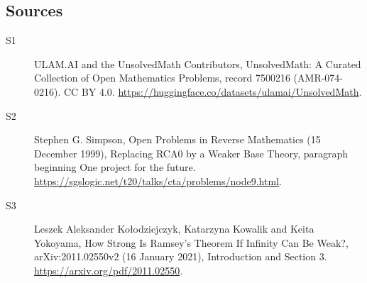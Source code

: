 \documentclass[11pt]{article}
\begin{document}
\subsection{Sources}
\begin{description}
\item[\hypertarget{source:7500216:1}{S1}] ULAM.AI and the UnsolvedMath Contributors, UnsolvedMath: A Curated Collection of Open Mathematics Problems, record 7500216 (AMR-074-0216). CC BY 4.0. \url{https://huggingface.co/datasets/ulamai/UnsolvedMath}.
\item[\hypertarget{source:7500216:2}{S2}] Stephen G. Simpson, Open Problems in Reverse Mathematics (15 December 1999), Replacing RCA0 by a Weaker Base Theory, paragraph beginning One project for the future. \url{https://sgslogic.net/t20/talks/cta/problems/node9.html}.
\item[\hypertarget{source:7500216:3}{S3}] Leszek Aleksander Ko\l odziejczyk, Katarzyna Kowalik and Keita Yokoyama, How Strong Is Ramsey's Theorem If Infinity Can Be Weak?, arXiv:2011.02550v2 (16 January 2021), Introduction and Section 3. \url{https://arxiv.org/pdf/2011.02550}.
\end{description}
\label{end:7500216}
\end{document}

